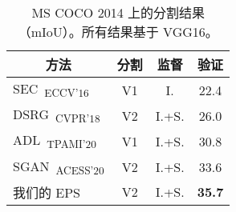 \begin{table}[]
\centering
{\small
\begin{tabular}{@{}lccc@{}}
\toprule
\multicolumn{1}{c}{方法}                                                  &分割       &监督   & \multicolumn{1}{c}{验证}           \\ \midrule
\multicolumn{1}{l}{SEC~\cite{kolesnikov2016seed}\textsubscript{ECCV'16}}    & V1        &I.     & \multicolumn{1}{c}{22.4}          \\
\multicolumn{1}{l}{DSRG~\cite{huang2018weakly}\textsubscript{CVPR'18}}      & V2        &I.+S.  & \multicolumn{1}{c}{26.0}          \\
\multicolumn{1}{l}{ADL~\cite{choe2020attention}\textsubscript{TPAMI'20}}    & V1        &I.+S.  & \multicolumn{1}{c}{30.8}          \\
\multicolumn{1}{l}{SGAN~\cite{yao2020saliency}\textsubscript{ACESS'20}}     & V2        &I.+S.  & \multicolumn{1}{c}{33.6}          \\ \midrule
\multicolumn{1}{l}{我们的 EPS}                                                 & V2        &I.+S.  & \multicolumn{1}{c}{\textbf{35.7}} \\ \bottomrule
\end{tabular}
}
\vspace{2mm}
\caption{MS COCO 2014 上的分割结果（mIoU）。所有结果基于 VGG16。}\vspace{-2mm}
\label{tab:seg_quantitative_coco}
\end{table}

